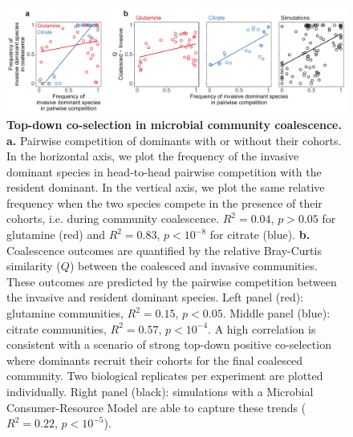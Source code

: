 \documentclass[a4paper,10pt]{article}
\begin{document}
\clearpage

\begin{figure}[!h]
\centering
\internallinenumbers
\includegraphics[scale=0.7,keepaspectratio]{figs/fig2_v3.pdf}
\caption{\textbf{Top-down co-selection in microbial community coalescence.}
\textbf{a.} Pairwise competition of dominants with or without their cohorts.
In the horizontal axis, we plot the frequency of the invasive dominant species
in head-to-head pairwise competition with the resident dominant.
In the vertical axis, we plot the same relative frequency when the two species compete
in the presence of their cohorts, i.e. during community coalescence.
$R^2=0.04$, $p>0.05$ for glutamine (red)
and $R^2=0.83$, $p<10^{-8}$ for citrate (blue).
\textbf{b.} Coalescence outcomes are quantified by the relative Bray-Curtis similarity
($Q$) between the coalesced and invasive communities.
These outcomes are predicted by the pairwise competition between the invasive and
resident dominant species.
Left panel (red): glutamine communities, $R^2=0.15$, $p<0.05$.
Middle panel (blue): citrate communities, $R^2=0.57$, $p<10^{-4}$.
A high correlation is consistent with a scenario of
strong top-down positive co-selection where dominants recruit their cohorts for the final
coalesced community. Two biological replicates per experiment are plotted individually.
Right panel (black): simulations with a Microbial Consumer-Resource Model are able
to capture these trends ($R^2=0.22$, $p<10^{-5}$).}
\label{fig2}
\end{figure}

\clearpage
\end{document}

